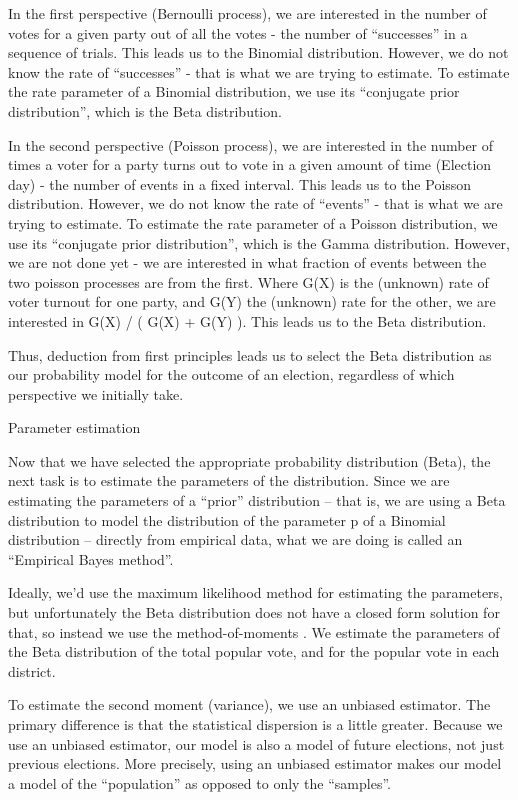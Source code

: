 \documentclass[preprint,12pt]{article}
\begin{document}
In the first perspective (Bernoulli process), we are interested in the number of votes for a given party out of all the votes - the number of “successes” in a sequence of trials.  This leads us to the Binomial distribution.  However, we do not know the rate of “successes” - that is what we are trying to estimate.  To estimate the rate parameter of a Binomial distribution, we use its “conjugate prior distribution”, which is the Beta distribution.
 
In the second perspective (Poisson process), we are interested in the number of times a voter for a party turns out to vote in a given amount of time (Election day) - the number of events in a fixed interval. This leads us to the Poisson distribution.  However, we do not know the rate of “events” - that is what we are trying to estimate.  To estimate the rate parameter of a Poisson distribution, we use its “conjugate prior distribution”, which is the Gamma distribution.  However, we are not done yet - we are interested in what fraction of events between the two poisson processes are from the first.  Where G(X) is the (unknown) rate of voter turnout for one party, and G(Y) the (unknown) rate for the other, we are interested in G(X) / ( G(X) + G(Y) ).  This leads us to the Beta distribution.
 
Thus, deduction from first principles leads us to select the Beta distribution as our probability model for the outcome of an election, regardless of which perspective we initially take.
 
Parameter estimation
 
Now that we have selected the appropriate probability distribution (Beta), the next task is to estimate the parameters of the distribution.  Since we are estimating the parameters of a “prior” distribution -- that is, we are using a Beta distribution to model the distribution of the parameter p of a Binomial distribution -- directly from empirical data, what we are doing is called an “Empirical Bayes method”.
 
Ideally, we’d use the maximum likelihood method for estimating the parameters, but unfortunately the Beta distribution does not have a closed form solution for that, so instead we use the method-of-moments .  We estimate the parameters of the Beta distribution of the total popular vote, and for the popular vote in each district.  
 
To estimate the second moment (variance), we use an unbiased estimator.  The primary difference is that the statistical dispersion is a little greater.  Because we use an unbiased estimator, our model is also a model of future elections, not just previous elections.  More precisely, using an unbiased estimator makes our model a model of the “population” as opposed to only the “samples”.
 
\end{document}
